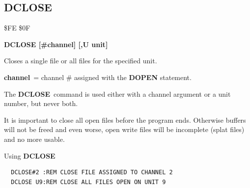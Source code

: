 \subsection{DCLOSE}
\begin{description}[leftmargin=2cm,style=nextline]
\item [Token:] \$FE \$0F
\item [Format:] {\bf DCLOSE [\#channel] [,U unit] }
\item [Usage:]
   Closes a single file or
   all files for the specified unit.

   {\bf channel} = channel \# assigned with the {\bf DOPEN} statement.

   \unitdefinition

   The {\bf DCLOSE} command is used either with a channel argument
   or a unit number, but never both.

\item [Remarks:]
   It is important to close all open files before the program ends.
   Otherwise buffers will not be freed and even worse, open write
   files will be incomplete (splat files) and no more usable.

\item [Example:] Using {\bf DCLOSE}
\begin{tcolorbox}[colback=black,coltext=white]
\verbatimfont{\codefont}
\begin{verbatim}
  DCLOSE#2 :REM CLOSE FILE ASSIGNED TO CHANNEL 2
  DCLOSE U9:REM CLOSE ALL FILES OPEN ON UNIT 9
\end{verbatim}
\end{tcolorbox}
\end{description}


\newpage
